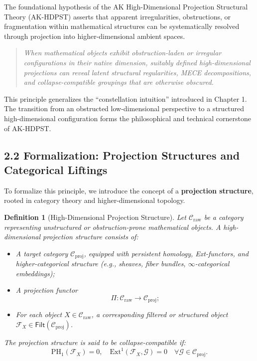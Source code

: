 \documentclass[11pt]{article}
\newtheorem{definition}[theorem]{Definition}
\begin{document}
The foundational hypothesis of the AK High-Dimensional Projection Structural Theory (AK-HDPST) asserts that apparent irregularities, obstructions, or fragmentation within mathematical structures can be systematically resolved through projection into higher-dimensional ambient spaces.

\begin{quote}
\textit{
When mathematical objects exhibit obstruction-laden or irregular configurations in their native dimension,  
suitably defined high-dimensional projections can reveal latent structural regularities, MECE decompositions,  
and collapse-compatible groupings that are otherwise obscured.
}
\end{quote}

This principle generalizes the ``constellation intuition'' introduced in Chapter 1. The transition from an obstructed low-dimensional perspective to a structured high-dimensional configuration forms the philosophical and technical cornerstone of AK-HDPST.

\subsection*{2.2 Formalization: Projection Structures and Categorical Liftings}

To formalize this principle, we introduce the concept of a \textbf{projection structure}, rooted in category theory and higher-dimensional topology.

\begin{definition}[High-Dimensional Projection Structure]
Let \( \mathcal{C}_{\mathrm{raw}} \) be a category representing unstructured or obstruction-prone mathematical objects.  
A \emph{high-dimensional projection structure} consists of:

\begin{itemize}
    \item A target category \( \mathcal{C}_{\mathrm{proj}} \), equipped with persistent homology, Ext-functors, and higher-categorical structure (e.g., sheaves, fiber bundles, $\infty$-categorical embeddings);
    \item A projection functor
    \[
    \Pi : \mathcal{C}_{\mathrm{raw}} \longrightarrow \mathcal{C}_{\mathrm{proj}};
    \]
    \item For each object \( X \in \mathcal{C}_{\mathrm{raw}} \), a corresponding filtered or structured object \( \mathcal{F}_X \in \mathsf{Filt}(\mathcal{C}_{\mathrm{proj}}) \).
\end{itemize}

The projection structure is said to be \emph{collapse-compatible} if:
\[
\mathrm{PH}_1(\mathcal{F}_X) = 0, \quad \mathrm{Ext}^1(\mathcal{F}_X, \mathcal{G}) = 0 \quad \forall \mathcal{G} \in \mathcal{C}_{\mathrm{proj}}.
\]
\end{definition}
\end{document}
